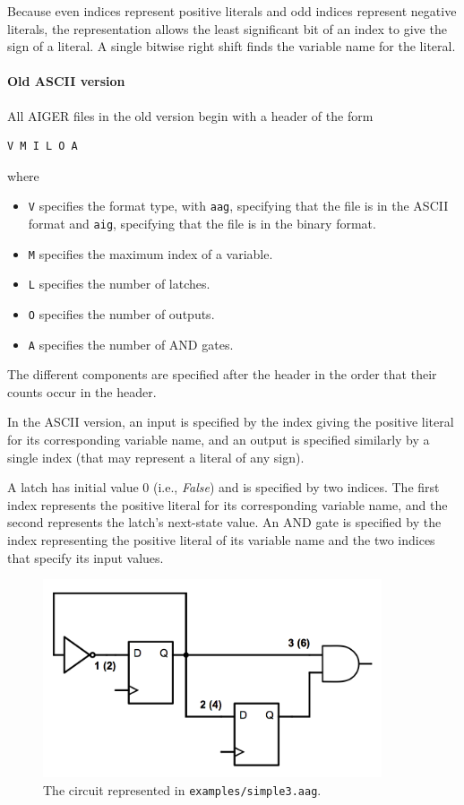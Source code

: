 \documentclass[12pt,a4paper,twoside,openright]{report}
\begin{document}
{{Because even indices represent positive literals and odd indices
represent negative literals, the representation allows
the least significant bit of an index to give the sign of a literal.
A single bitwise right shift finds the variable name for the literal.

\paragraph{Old ASCII version}{
All AIGER files in the old version begin with a header of the form
\begin{verbatim}
V M I L O A
\end{verbatim}
where
\begin{itemize}
\item \verb,V, specifies the format type, with \verb,aag,, specifying that the file is in the ASCII format and \verb,aig,, specifying that the file is in the binary format.
\item \verb,M, specifies the maximum index of a variable.
\item \verb,L, specifies the number of latches.
\item \verb,O, specifies the number of outputs.
\item \verb,A, specifies the number of AND gates.
\end{itemize}

The different components are specified after the header
in the order that their counts occur in the header.

In the ASCII version, an input is specified by the
index giving the positive literal for its corresponding variable name,
and an output is specified similarly by a single index (that may represent
a literal of any sign).

A latch has initial value 0 (i.e., {\it False}) and is specified by two indices.
The first index represents the positive literal for its corresponding variable name,
and the second represents the latch's next-state value.
An AND gate
is specified by the index representing the positive literal
of its variable name and the two indices that specify its input values.

\begin{figure}[t]
\centering
\includegraphics[width=100mm]{circuit.png}
\caption{The circuit represented in {\tt examples/simple3.aag}.}
\label{aagCircuit}
\end{figure}

}}}
\end{document}
